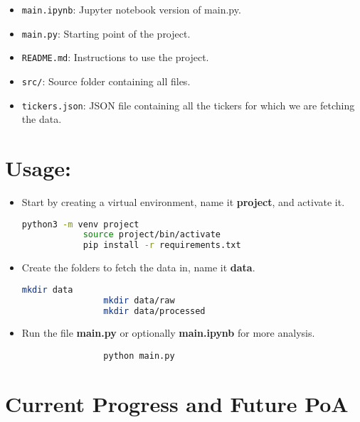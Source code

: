 \documentclass{article}
\begin{document}
\begin{itemize}
    \item \texttt{main.ipynb}: Jupyter notebook version of main.py.
    \item \texttt{main.py}: Starting point of the project.
    \item \texttt{README.md}: Instructions to use the project.
    \item \texttt{src/}: Source folder containing all files.
    \item \texttt{tickers.json}: JSON file containing all the tickers for which
          we are fetching the data.
\end{itemize}

\vspace{8.0pt}

\section*{\fontsize{20}{20}\selectfont Usage:}
\begin{itemize}
    \item Start by creating a virtual environment, name it \textbf{project},
          and activate it.
          \begin{lstlisting}[language=bash]
            python3 -m venv project
            source project/bin/activate
            pip install -r requirements.txt
        \end{lstlisting}
    \item Create the folders to fetch the data in, name it \textbf{data}.
          \begin{lstlisting}[language=bash]
                mkdir data
                mkdir data/raw
                mkdir data/processed
            \end{lstlisting}
    \item Run the file \textbf{main.py} or optionally \textbf{main.ipynb} for
          more analysis.
          \begin{lstlisting}
                python main.py
            \end{lstlisting}

\end{itemize}

\section*{\fontsize{20}{20}\selectfont Current Progress and Future
  PoA}
\end{document}
